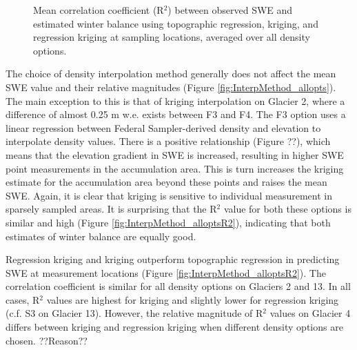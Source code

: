 \documentclass{sfuthesis}
\begin{document}
\begin{figure}
	\caption{Mean correlation coefficient (R$^2$) between observed SWE and estimated winter balance using topographic regression, kriging, and regression kriging at sampling locations, averaged over all density options.}
	\label{fig:InterpMethod_meanR2}
\end{figure}

The choice of density interpolation method generally does not affect the mean SWE value and their relative magnitudes (Figure \ref{fig:InterpMethod_allopts}). The main exception to this is that of kriging interpolation on Glacier 2, where a difference of almost 0.25 m w.e. exists between F3 and F4. The F3 option uses a linear regression between Federal Sampler-derived density and elevation to interpolate density values. There is a positive relationship (Figure ??), which means that the elevation gradient in SWE is increased, resulting in higher SWE point measurements in the accumulation area. This is turn increases the kriging estimate for the accumulation area beyond these points and raises the mean SWE. Again, it is clear that kriging is sensitive to individual measurement in sparsely sampled areas. It is surprising that the R$^2$ value for both these options is similar and high (Figure \ref{fig:InterpMethod_alloptsR2}), indicating that both estimates of winter balance are equally good. 

Regression kriging and kriging outperform topographic regression in predicting SWE at measurement locations (Figure \ref{fig:InterpMethod_alloptsR2}). The correlation coefficient is similar for all density options on Glaciers 2 and 13. In all cases, R$^2$ values are highest for kriging and slightly lower for regression kriging (c.f. S3 on Glacier 13). However, the relative magnitude of R$^2$ values on Glacier 4 differs between kriging and regression kriging when different density options are chosen.  ??Reason??
\end{document}
